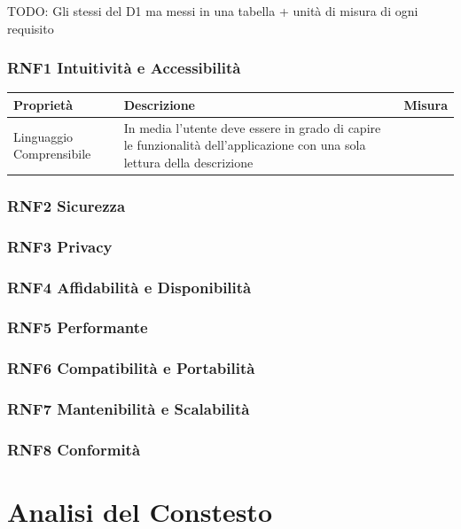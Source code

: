 \documentclass{report}
\begin{document}
TODO: Gli stessi del D1 ma messi in una tabella + unità di misura di ogni requisito

\subsection*{RNF1 Intuitività e Accessibilità}
\begin{center} %
	\centering
	\begin{tabular}{ |p{3cm}|p{4cm}|p{4cm}|  }
		\hline
		\centering Proprietà & \qquad\quad Descrizione & \qquad\qquad Misura\\ %
		\hline
		Linguaggio Comprensibile & In media l’utente deve essere in grado di capire le funzionalità dell'applicazione con una
		sola lettura della descrizione &  \\
		\hline
	\end{tabular}
\end{center}

\subsection*{RNF2 Sicurezza}
\subsection*{RNF3 Privacy}
\subsection*{RNF4 Affidabilità e Disponibilità}
\subsection*{RNF5 Performante}
\subsection*{RNF6 Compatibilità e Portabilità}
\subsection*{RNF7 Mantenibilità e Scalabilità}
\subsection*{RNF8 Conformità}

\chapter{Analisi del Constesto}
\end{document}
